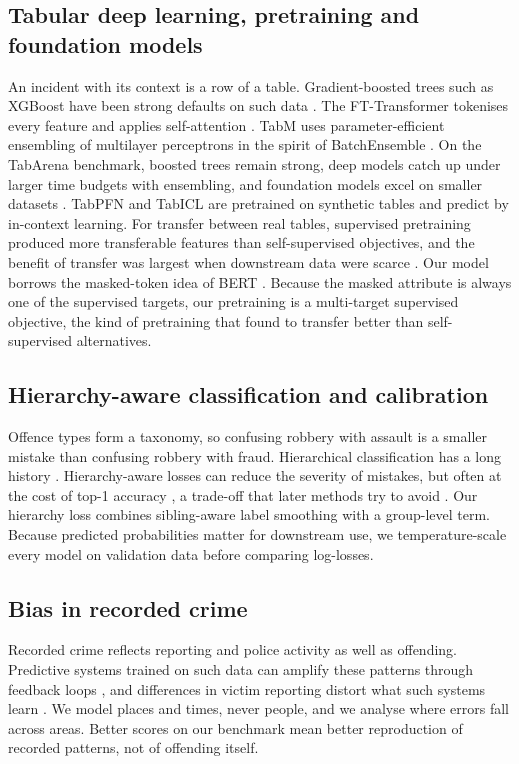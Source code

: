\documentclass[11pt]{article}
\begin{document}
\subsection{Tabular deep learning, pretraining and foundation models}
An incident with its context is a row of a table. Gradient-boosted trees such as XGBoost \citep{chen2016xgboost} have been strong defaults on such data \citep{grinsztajn2022}. The FT-Transformer tokenises every feature and applies self-attention \citep{gorishniy2021}. TabM uses parameter-efficient ensembling of multilayer perceptrons in the spirit of BatchEnsemble \citep{gorishniy2025,wen2020}. On the TabArena benchmark, boosted trees remain strong, deep models catch up under larger time budgets with ensembling, and foundation models excel on smaller datasets \citep{erickson2025}. TabPFN \citep{hollmann2025} and TabICL \citep{qu2025tabicl,qu2026tabiclv2} are pretrained on synthetic tables and predict by in-context learning. For transfer between real tables, supervised pretraining produced more transferable features than self-supervised objectives, and the benefit of transfer was largest when downstream data were scarce \citep{levin2023}. Our model borrows the masked-token idea of BERT \citep{devlin2019}. Because the masked attribute is always one of the supervised targets, our pretraining is a multi-target supervised objective, the kind of pretraining that \citet{levin2023} found to transfer better than self-supervised alternatives.

\subsection{Hierarchy-aware classification and calibration}
Offence types form a taxonomy, so confusing robbery with assault is a smaller mistake than confusing robbery with fraud. Hierarchical classification has a long history \citep{silla2011}. Hierarchy-aware losses can reduce the severity of mistakes, but often at the cost of top-1 accuracy \citep{bertinetto2020}, a trade-off that later methods try to avoid \citep{garg2022}. Our hierarchy loss combines sibling-aware label smoothing \citep{szegedy2016} with a group-level term. Because predicted probabilities matter for downstream use, we temperature-scale every model on validation data \citep{guo2017} before comparing log-losses.

\subsection{Bias in recorded crime}
Recorded crime reflects reporting and police activity as well as offending. Predictive systems trained on such data can amplify these patterns through feedback loops \citep{ensign2018}, and differences in victim reporting distort what such systems learn \citep{akpinar2021}. We model places and times, never people, and we analyse where errors fall across areas. Better scores on our benchmark mean better reproduction of recorded patterns, not of offending itself.
\end{document}

